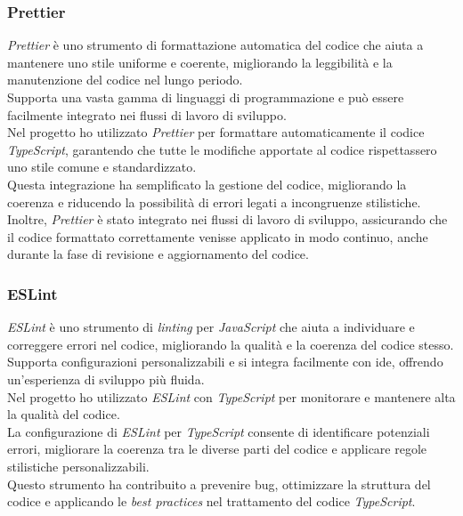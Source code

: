 \subsubsection{Prettier}

\textit{Prettier} è uno strumento di formattazione automatica del codice che aiuta a mantenere uno stile uniforme e coerente, migliorando la leggibilità e la manutenzione del codice nel lungo periodo.\\
Supporta una vasta gamma di linguaggi di programmazione e può essere facilmente integrato nei flussi di lavoro di sviluppo.\\

\noindent Nel progetto ho utilizzato \textit{Prettier} per formattare automaticamente il codice \textit{TypeScript}, garantendo che tutte le modifiche apportate al codice rispettassero uno stile comune e standardizzato.\\
Questa integrazione ha semplificato la gestione del codice, migliorando la coerenza e riducendo la possibilità di errori legati a incongruenze stilistiche. \\
Inoltre, \textit{Prettier} è stato integrato nei flussi di lavoro di sviluppo, assicurando che il codice formattato correttamente venisse applicato in modo continuo, anche durante la fase di revisione e aggiornamento del codice.

\subsubsection{ESLint}

\textit{ESLint} è uno strumento di \textit{linting} per \textit{JavaScript} che aiuta a individuare e correggere errori nel codice, migliorando la qualità e la coerenza del codice stesso.\\
Supporta configurazioni personalizzabili e si integra facilmente con \gls{ide}, offrendo un'esperienza di sviluppo più fluida.\\

\noindent Nel progetto ho utilizzato \textit{ESLint} con \textit{TypeScript} per monitorare e mantenere alta la qualità del codice. \\
La configurazione di \textit{ESLint} per \textit{TypeScript} consente di identificare potenziali errori, migliorare la coerenza tra le diverse parti del codice e applicare regole stilistiche personalizzabili.\\
Questo strumento ha contribuito a prevenire bug, ottimizzare la struttura del codice e applicando le \textit{best practices} nel trattamento del codice \textit{TypeScript}.


